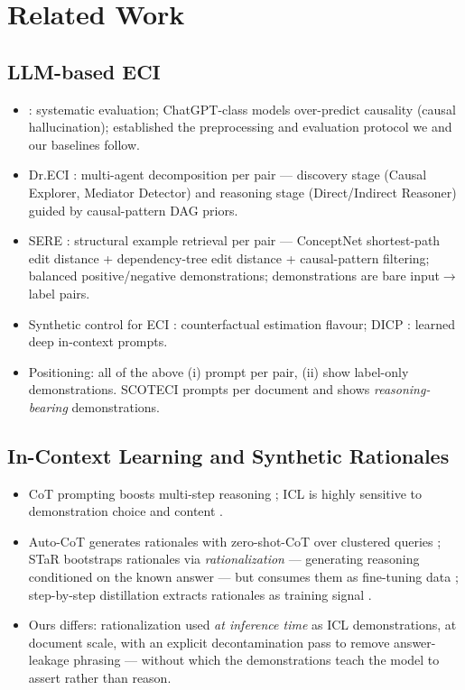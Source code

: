 \documentclass[11pt]{article}
\newcommand{\method}{SCOTECI}
\begin{document}
\section{Related Work}
\label{sec:related}


\subsection{LLM-based ECI}
\begin{itemize}
  \item \citet{gao2023chatgpt}: systematic evaluation; ChatGPT-class models
        over-predict causality (causal hallucination); established the
        preprocessing and evaluation protocol we and our baselines follow.
  \item Dr.ECI \citep{cai2025dreci}: multi-agent decomposition per pair ---
        discovery stage (Causal Explorer, Mediator Detector) and reasoning stage
        (Direct/Indirect Reasoner) guided by causal-pattern DAG priors.
  \item SERE \citep{hao2026sere}: structural example retrieval per pair ---
        ConceptNet shortest-path edit distance + dependency-tree edit distance +
        causal-pattern filtering; balanced positive/negative demonstrations;
        demonstrations are bare input$\to$label pairs.
  \item Synthetic control for ECI \citep{wang2024synthetic}: counterfactual
        estimation flavour; DICP \citep{mu2025dicp}: learned deep in-context
        prompts.
  \item Positioning: all of the above (i) prompt per pair, (ii) show label-only
        demonstrations. \method{} prompts per document and shows
        \emph{reasoning-bearing} demonstrations.
\end{itemize}

\subsection{In-Context Learning and Synthetic Rationales}
\begin{itemize}
  \item CoT prompting boosts multi-step reasoning \citep{wei2022chain}; ICL is
        highly sensitive to demonstration choice and content
        \citep{liu2022makes, min2022rethinking}.
  \item Auto-CoT generates rationales with zero-shot-CoT over clustered queries
        \citep{zhang2023autocot}; STaR bootstraps rationales via
        \emph{rationalization} --- generating reasoning conditioned on the known
        answer --- but consumes them as fine-tuning data \citep{zelikman2022star};
        step-by-step distillation extracts rationales as training signal
        \citep{hsieh2023distilling}.
  \item Ours differs: rationalization used \emph{at inference time} as ICL
        demonstrations, at document scale, with an explicit decontamination pass
        to remove answer-leakage phrasing --- without which the demonstrations
        teach the model to assert rather than reason.
\end{itemize}
\end{document}
